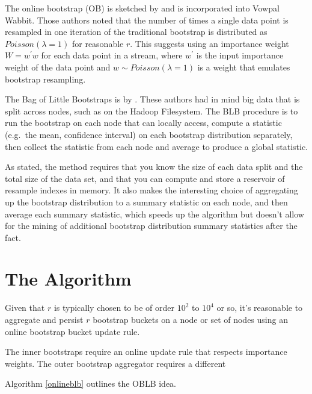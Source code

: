 \documentclass{article}
\begin{document}
The online bootstrap (OB) is sketched by \cite{bib:onlineboot} and is
incorporated into Vowpal Wabbit. Those authors noted that the number of times
a single data point is resampled in one iteration of the traditional bootstrap
is distributed as $Poisson(\lambda = 1)$ for reasonable $r$. This suggests
using an importance weight $W = w^{\prime}w$ for each data point in a stream,
where $w^{\prime}$ is the input importance weight of the data point and $w
\sim Poisson(\lambda = 1)$ is a weight that emulates bootstrap resampling.

The Bag of Little Bootstraps is by \cite{bib:blb}. These authors had in mind
big data that is split across nodes, such as on the Hadoop Filesystem. The BLB
procedure is to run the bootstrap on each node that can locally access,
compute a statistic (e.g.\ the mean, confidence interval) on each bootstrap
distribution separately, then collect the statistic from each node and average
to produce a global statistic.

As stated, the method requires that you know the size of each data split and
the total size of the data set, and that you can compute and store a reservoir
of resample indexes in memory. It also makes the interesting choice of
aggregating up the bootstrap distribution to a summary statistic on each node,
and then average each summary statistic, which speeds up the algorithm but
doesn't allow for the mining of additional bootstrap distribution summary
statistics after the fact.

\section{The Algorithm}

Given that $r$ is typically chosen to be of order $10^2$ to $10^4$ or so, it's
reasonable to aggregate and persist $r$ bootstrap buckets on a node or set of
nodes using an online bootstrap bucket update rule.

The inner bootstraps require an online update rule that respects importance
weights. The outer bootstrap aggregator requires a different

Algorithm \ref{onlineblb} outlines the OBLB idea.
\end{document}
